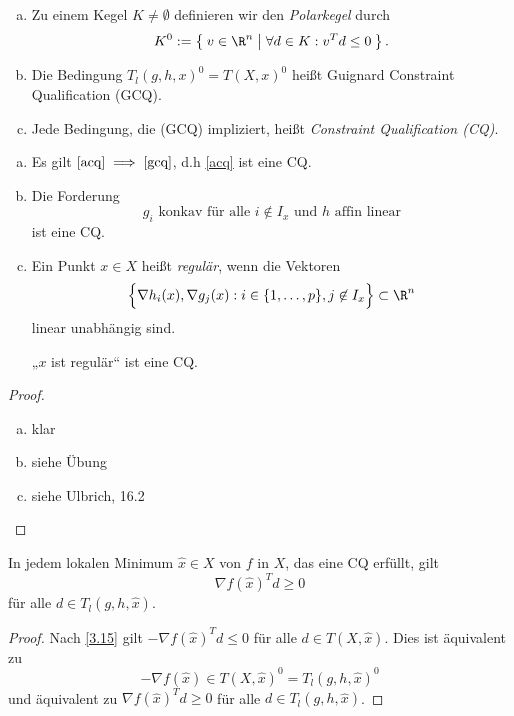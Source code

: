 \begin{df} \label{3.20}
	\begin{enumerate}[(a)]
		\item
			Zu einem Kegel $K \neq \emptyset$ definieren wir den \emph{Polarkegel} durch
			\[
				K^0 := \Set{ v \in \R^n | \forall d \in K : v^T d \le 0 }.
			\]
		\item
			Die Bedingung $T_l(g,h,x)^0 = T(X,x)^0 \label{gcq}$ heißt Guignard Constraint Qualification (GCQ).
		\item
			Jede Bedingung, die (GCQ) impliziert, heißt \emph{Constraint Qualification (CQ)}.
	\end{enumerate}
\end{df}

\begin{ex} \label{3.21}
	\begin{enumerate}[(a)]
		\item
			Es gilt $\eqref{acq} \implies \eqref{gcq}$, d.h \eqref{acq} ist eine CQ.
		\item
			Die Forderung
			\[
				\text{$g_i$ konkav für alle $i \not\in I_x$ und $h$ affin linear}
			\]
			ist eine CQ.
		\item
			Ein Punkt $x \in X$ heißt \emph{regulär}, wenn die Vektoren
			\[
				\Big\{ \nabla h_i(x), \nabla g_j(x) : i \in \{1, \dotsc, p\}, j \not\in I_x \Big\} \subset \R^n
			\]
			linear unabhängig sind.

			„$x$ ist regulär“ ist eine CQ.
	\end{enumerate}
	\begin{proof}
		\begin{enumerate}[(a)]
			\item
				klar
			\item
				siehe Übung
			\item
				siehe Ulbrich, 16.2 %
		\end{enumerate}
	\end{proof}
\end{ex}

\begin{st} \label{3.22}
	In jedem lokalen Minimum $\hat x \in X$ von $f$ in $X$, das eine CQ erfüllt, gilt
	\[
		\nabla f(\hat x)^T d \ge 0
	\]
	für alle $d \in T_l(g,h,\hat x)$.
	\begin{proof}
		Nach \ref{3.15} gilt $-\nabla f(\hat x)^T d \le 0$ für alle $d \in T(X, \hat x)$.
		Dies ist äquivalent zu
		\[
			-\nabla f(\hat x) \in T(X,\hat x)^0 = T_l (g,h,\hat x)^0
		\]
		und äquivalent zu $\nabla f(\hat x)^T d \ge 0$ für alle $d \in T_l(g, h, \hat x)$.
	\end{proof}
\end{st}

